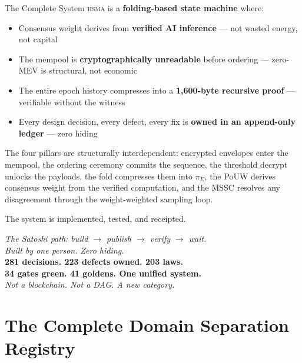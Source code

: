 \documentclass[11pt, a4paper]{article}
\theoremstyle{plain}
\theoremstyle{definition}
\theoremstyle{remark}
\newcommand{\hsma}{\textsc{hsma}}
\begin{document}
\begin{resultbox}{The Complete System}
\hsma{} is a \textbf{folding-based state machine} where:

\begin{itemize}
\item Consensus weight derives from \textcolor{hsmaBlue}{\textbf{verified AI inference}} --- not wasted energy, not capital
\item The mempool is \textcolor{hsmaGold}{\textbf{cryptographically unreadable}} before ordering --- zero-MEV is structural, not economic
\item The entire epoch history compresses into a \textcolor{hsmaPurple}{\textbf{1{,}600-byte recursive proof}} --- verifiable without the witness
\item Every design decision, every defect, every fix is \textcolor{hsmaGreen}{\textbf{owned in an append-only ledger}} --- zero hiding
\end{itemize}

The four pillars are structurally interdependent: encrypted envelopes
enter the mempool, the ordering ceremony commits the sequence, the
threshold decrypt unlocks the payloads, the fold compresses them into
 $\pi_E$, the PoUW derives consensus weight from the verified
computation, and the MSSC resolves any disagreement through the
weight-weighted sampling loop.

The system is implemented, tested, and receipted.
\end{resultbox}

\vspace{1em}
\begin{center}
{\large\itshape The Satoshi path: build $\to$ publish $\to$ verify $\to$ wait.}\\[0.5em]
{\large\itshape Built by one person. Zero hiding.}\\[1em]
{\Large\bfseries\color{hsmaBlue} 281 decisions. 223 defects owned. 203 laws.\\
34 gates green. 41 goldens. One unified system.}\\[0.5em]
{\large\itshape Not a blockchain. Not a DAG. A new category.}
\end{center}

\appendix

\section{The Complete Domain Separation Registry}
\end{document}
